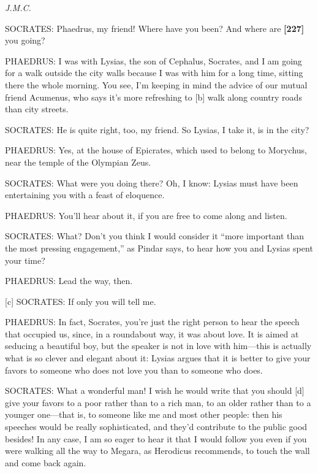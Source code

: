 {\em J.M.C.}\crlf
\crlf
\crlf

SOCRATES: Phaedrus, my friend! Where have you been? And where are
{\bf {[}227{]}} you going?

PHAEDRUS: I was with Lysias, the son of
Cephalus, Socrates, and
I am going for a walk outside the city walls because I was with him for
a long time, sitting there the whole morning. You see, I'm keeping in
mind the advice of our mutual friend
Acumenus, who says it's
more refreshing to {[}b{]} walk along country roads than city streets.

SOCRATES: He is quite right, too, my friend. So Lysias, I take it, is in
the city?

PHAEDRUS: Yes, at the house of Epicrates, which used to belong to
Morychus, near the
temple of the Olympian Zeus.

SOCRATES: What were you doing there? Oh, I know: Lysias must have been
entertaining you with a feast of eloquence.

PHAEDRUS: You'll hear about it, if you are free to come along and
listen.

SOCRATES: What? Don't you think I would consider it “more important than
the most pressing engagement,” as Pindar says, to hear how you and
Lysias spent your time?

PHAEDRUS: Lead the way, then.

{[}c{]} SOCRATES: If only you will tell me.

PHAEDRUS: In fact, Socrates, you're just the right person to hear the
speech that occupied us, since, in a roundabout way, it was about love.
It is aimed at seducing a beautiful boy, but the speaker is not in love
with him---this is actually what is so clever and elegant about it:
Lysias argues that it is better to give your favors to someone who does
not love you than to someone who does.

SOCRATES: What a wonderful man! I wish he would write that you should
{[}d{]} give your favors to a poor rather than to a rich man, to an
older rather than to a younger one---that is, to someone like me and
most other people: then his speeches would be really sophisticated, and
they'd contribute to the public good besides! In any case, I am so eager
to hear it that I would follow you even if you were walking all the way
to Megara, as Herodicus recommends, to touch the wall and come back
again.

